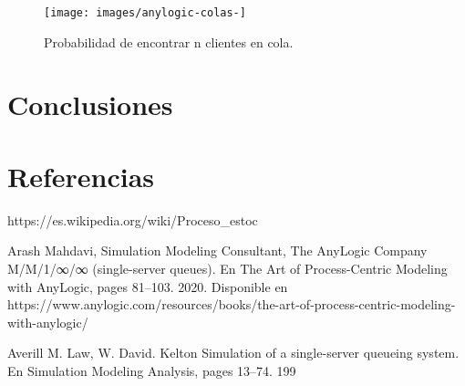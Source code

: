     \begin{figure}[H]
        \texttt{[image: images/anylogic-colas-]}
        \caption{Probabilidad de encontrar n clientes en cola.}
    \end{figure}

\section{Conclusiones}
\section{Referencias}
  \label{sec:references}
    https://es.wikipedia.org/wiki/Proceso_estoc%

    Arash Mahdavi, Simulation Modeling Consultant, The AnyLogic Company M/M/1/∞/∞ (single-server
    queues). En The Art of Process-Centric Modeling with AnyLogic, pages 81–103. 2020. Disponible en https://www.anylogic.com/resources/books/the-art-of-process-centric-modeling-with-anylogic/

    Averill M. Law, W. David. Kelton Simulation of a single-server queueing system. En Simulation Modeling Analysis,
    pages 13–74. 199
